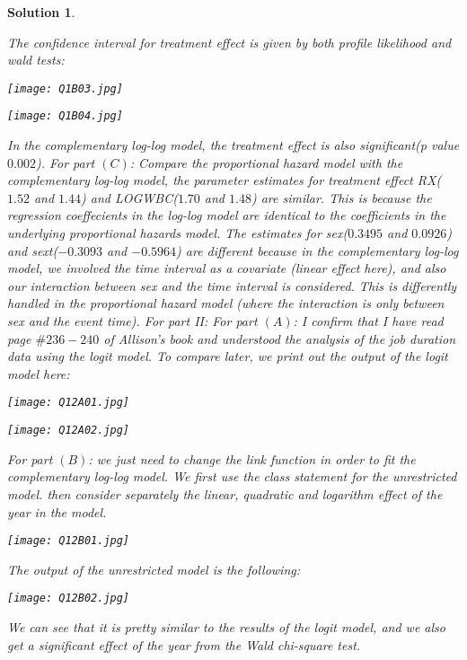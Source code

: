 \documentclass[11pt]{article}
\newtheorem{sol}{Solution}
\begin{document}
\begin{sol}
\begin{center}
	\end{center}
	The confidence interval for treatment effect is given by both profile likelihood and wald tests:
	\begin{center}
		\texttt{[image: Q1B03.jpg]}
	\end{center}
	\begin{center}
		\texttt{[image: Q1B04.jpg]}
	\end{center}
	In the complementary log-log model, the treatment effect is also significant(p value $0.002$).\vskip 2mm
	For part $(C)$:\vskip 2mm
	Compare the proportional hazard model with the complementary log-log model, the parameter estimates for treatment effect RX($1.52$ and $1.44$) and LOGWBC($1.70$ and $1.48$) are similar. This is because the regression coeffecients in the log-log model are identical to the coefficients in the underlying proportional hazards model.\vskip 2mm
	The estimates for sex($0.3495$ and $0.0926$) and sext($-0.3093$ and $-0.5964$) are different because in the complementary log-log model, we involved the time interval as a covariate (linear effect here), and also our interaction between sex and the time interval is considered. This is differently handled in the proportional hazard model (where the interaction is only between sex and the event time).\vskip 2mm
	For part II:\vskip 2mm
	For part $(A)$:\vskip 2mm
	I confirm that I have read page $\#236-240$ of Allison's book and understood the analysis of the job duration data using the logit model.\vskip 2mm
	To compare later, we print out the output of the logit model here:
	\begin{center}
		\texttt{[image: Q12A01.jpg]}
	\end{center}
	\begin{center}
		\texttt{[image: Q12A02.jpg]}
	\end{center}
	For part $(B)$:\vskip 2mm
	we just need to change the link function in order to fit the complementary log-log model. We first use the class statement for the unrestricted model. then consider separately the linear, quadratic and logarithm effect of the year in the model.
	\begin{center}
		\texttt{[image: Q12B01.jpg]}
	\end{center}
	The output of the unrestricted model is the following:
	\begin{center}
		\texttt{[image: Q12B02.jpg]}
	\end{center}
	We can see that it is pretty similar to the results of the logit model, and we also get a significant effect of the year from the Wald chi-square test.\vskip 2mm

\end{sol}
\end{document}
